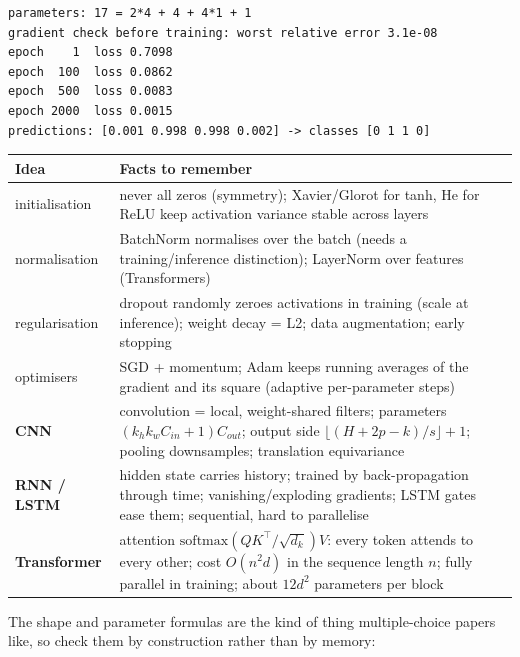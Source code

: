\documentclass[10pt,a4paper,openany,oneside]{report}
\begin{document}
\begin{lstlisting}[style=out,basicstyle=\ttfamily\fontsize{7.2}{8.6}\selectfont,title={Captured output}]
parameters: 17 = 2*4 + 4 + 4*1 + 1
gradient check before training: worst relative error 3.1e-08
epoch    1  loss 0.7098
epoch  100  loss 0.0862
epoch  500  loss 0.0083
epoch 2000  loss 0.0015
predictions: [0.001 0.998 0.998 0.002] -> classes [0 1 1 0]
\end{lstlisting}
\begin{center}\small
\begin{xltabular}{\textwidth}{@{}L{3.1cm}Y@{}}
\toprule
\textbf{Idea} & \textbf{Facts to remember}\\
\midrule\endhead
initialisation & never all zeros (symmetry); Xavier/Glorot for tanh, He for ReLU keep activation variance stable across layers\\
normalisation & BatchNorm normalises over the batch (needs a training/inference distinction); LayerNorm over features (Transformers)\\
regularisation & dropout randomly zeroes activations in training (scale at inference); weight decay = L2; data augmentation; early stopping\\
optimisers & SGD + momentum; Adam keeps running averages of the gradient and its square (adaptive per-parameter steps)\\
\textbf{CNN} & convolution = local, weight-shared filters; parameters $(k_hk_wC_{in}+1)C_{out}$; output side $\lfloor(H+2p-k)/s\rfloor+1$; pooling downsamples; translation equivariance\\
\textbf{RNN / LSTM} & hidden state carries history; trained by back-propagation through time; vanishing/exploding gradients; LSTM gates ease them; sequential, hard to parallelise\\
\textbf{Transformer} & attention $\mathrm{softmax}(QK^\top/\sqrt{d_k})V$: every token attends to every other; cost $O(n^2d)$ in the sequence length $n$; fully parallel in training; about $12d^2$ parameters per block\\
\bottomrule
\end{xltabular}
\end{center}
The shape and parameter formulas are the kind of thing multiple-choice papers like, so check them by construction rather than by memory:
\end{document}
